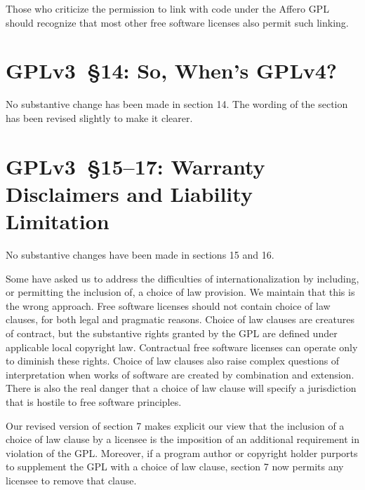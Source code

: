 Those who criticize the permission to link with code under the Affero
GPL should recognize that most other free software licenses also permit
such linking. 

\section{GPLv3~\S14: So, When's GPLv4?}
\label{GPLv3s14}


No substantive change has been made in section 14. The wording of the section
has been revised slightly to make it clearer.


\section{GPLv3~\S15--17: Warranty Disclaimers and Liability Limitation}

No substantive changes have been made in sections 15 and 16.




Some have asked us to address the difficulties of internationalization
by including, or permitting the inclusion of, a choice of law
provision.  We maintain that this is the wrong approach.  Free
software licenses should not contain choice of law clauses, for both
legal and pragmatic reasons.  Choice of law clauses are creatures of
contract, but the substantive rights granted by the GPL are defined
under applicable local copyright law. Contractual free software
licenses can operate only to diminish these rights.  Choice of law
clauses also raise complex questions of interpretation when works of
software are created by combination and extension.  There is also the
real danger that a choice of law clause will specify a jurisdiction
that is hostile to free software principles.


Our revised version of section 7 makes explicit our view that the
inclusion of a choice of law clause by a licensee is the imposition of
an additional requirement in violation of the GPL.  Moreover, if a
program author or copyright holder purports to supplement the GPL with
a choice of law clause, section 7 now permits any licensee to remove
that clause.


